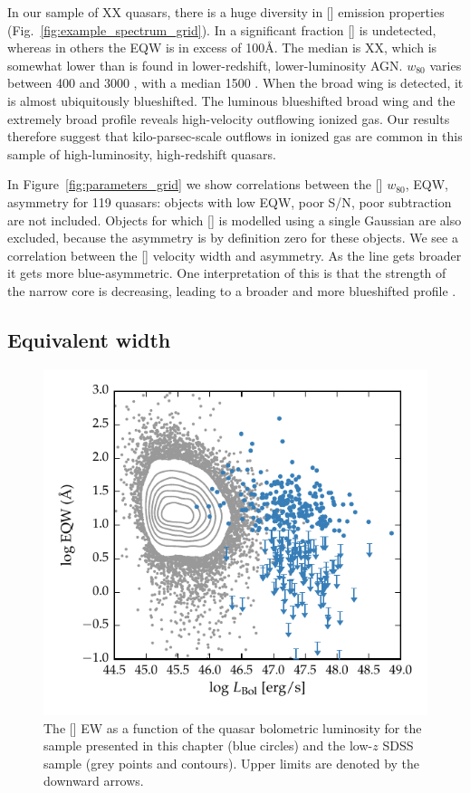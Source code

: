 In our sample of XX quasars, there is a huge diversity in [] emission properties (Fig.~\ref{fig:example_spectrum_grid}). 
In a significant fraction [] is undetected, whereas in others the \ac{EQW} is in excess of 100\AA. 
The median is XX, which is somewhat lower than is found in lower-redshift, lower-luminosity AGN. 
$w_{80}$ varies between 400 and 3000 \kms, with a median 1500 \kms.  
When the broad wing is detected, it is almost ubiquitously blueshifted.
The luminous blueshifted broad wing and the extremely broad profile reveals high-velocity outflowing ionized gas. 
Our results therefore suggest that kilo-parsec-scale outflows in ionized gas are common in this sample of high-luminosity, high-redshift quasars.

In Figure~\ref{fig:parameters_grid} we show correlations between the [] $w_{80}$, EQW, asymmetry for 119 quasars: objects with low \ac{EQW}, poor \ac{S/N}, poor  subtraction are not included. 
Objects for which [] is modelled using a single Gaussian are also excluded, because the asymmetry is by definition zero for these objects.   
We see a correlation between the [] velocity width and asymmetry. 
As the line gets broader it gets more blue-asymmetric. 
One interpretation of this is that the strength of the narrow core is decreasing, leading to a broader and more blueshifted profile \citep[e.g.][]{shen14}. 

\subsection{Equivalent width}

\begin{figure}
    \includegraphics[width=\columnwidth]{figures/chapter04/eqw_lum.pdf} 
    \caption{The [] EW as a function of the quasar bolometric luminosity for the sample presented in this chapter (blue circles) and the low-$z$ \ac{SDSS} sample (grey points and contours). Upper limits are denoted by the downward arrows.}     
    \label{fig:eqw_lum}
\end{figure}


